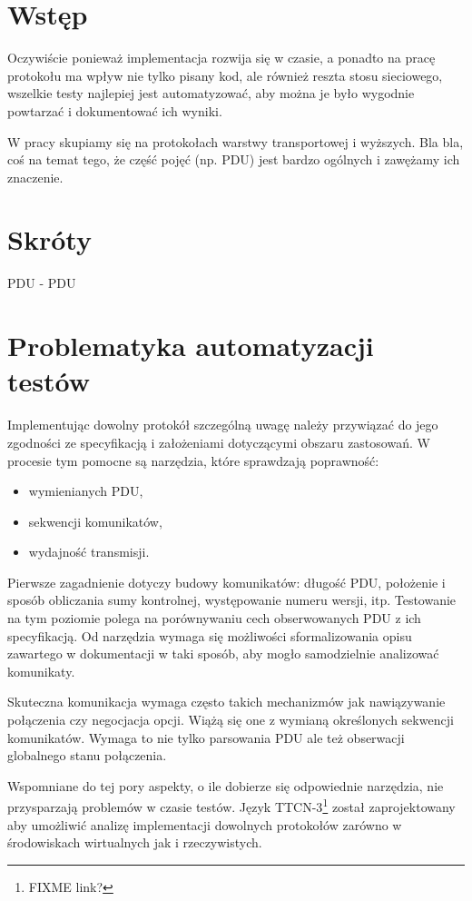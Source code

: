 \documentclass[a4paper,11pt]{mwart}
\begin{document}
\section{Wstęp}

Oczywiście ponieważ implementacja rozwija się w czasie, a ponadto na pracę
protokołu ma wpływ nie tylko pisany kod, ale również reszta stosu sieciowego,
wszelkie testy najlepiej jest automatyzować, aby można je było wygodnie
powtarzać i dokumentować ich wyniki.

W pracy skupiamy się na protokołach warstwy transportowej i wyższych. Bla bla,
coś na temat tego, że część pojęć (np. PDU) jest bardzo ogólnych i zawężamy ich
znaczenie.

\section{Skróty}

PDU - PDU

\section{Problematyka automatyzacji testów}

Implementując dowolny protokół szczególną uwagę należy przywiązać do jego
zgodności ze specyfikacją i założeniami dotyczącymi obszaru zastosowań.
W procesie tym pomocne są narzędzia, które sprawdzają poprawność:
\begin{itemize}
  \item{wymienianych PDU,}
  \item{sekwencji komunikatów,}
  \item{wydajność transmisji.}
\end{itemize}

Pierwsze zagadnienie dotyczy budowy komunikatów: długość PDU, położenie i sposób
obliczania sumy kontrolnej, występowanie numeru wersji, itp. Testowanie na tym
poziomie polega na porównywaniu cech obserwowanych PDU z ich specyfikacją. Od
narzędzia wymaga się możliwości sformalizowania opisu zawartego w dokumentacji w
taki sposób, aby mogło samodzielnie analizować komunikaty.

Skuteczna komunikacja wymaga często takich mechanizmów jak nawiązywanie
połączenia czy negocjacja opcji. Wiążą się one z wymianą określonych sekwencji
komunikatów. Wymaga to nie tylko parsowania PDU ale też obserwacji globalnego
stanu połączenia.

Wspomniane do tej pory aspekty, o ile dobierze się odpowiednie narzędzia, nie
przysparzają problemów w czasie testów. Język TTCN-3\footnote{FIXME link?}
został zaprojektowany aby umożliwić analizę implementacji dowolnych protokołów
zarówno w środowiskach wirtualnych jak i rzeczywistych.
\end{document}
